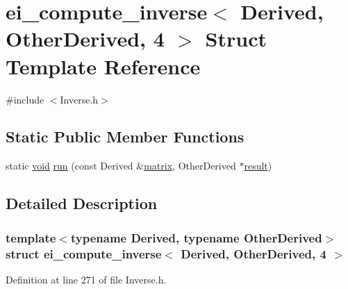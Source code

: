 \hypertarget{structei__compute__inverse_3_01_derived_00_01_other_derived_00_014_01_4}{\section{ei\-\_\-compute\-\_\-inverse$<$ Derived, Other\-Derived, 4 $>$ Struct Template Reference}
\label{structei__compute__inverse_3_01_derived_00_01_other_derived_00_014_01_4}
}


{\ttfamily \#include $<$Inverse.\-h$>$}

\subsection*{Static Public Member Functions}
\begin{DoxyCompactItemize}
\item 
static \hyperlink{group___u_a_v_objects_plugin_ga444cf2ff3f0ecbe028adce838d373f5c}{void} \hyperlink{structei__compute__inverse_3_01_derived_00_01_other_derived_00_014_01_4_a038abe47c79a8084fd44f40ad9aff57b}{run} (const Derived \&\hyperlink{glext_8h_a7b24a3f2f56eb1244ae69dacb4fecb6f}{matrix}, Other\-Derived $\ast$\hyperlink{qxtslotjob_8h_aab161efab0511ea9612b64c40e9852ca}{result})
\end{DoxyCompactItemize}


\subsection{Detailed Description}
\subsubsection*{template$<$typename Derived, typename Other\-Derived$>$struct ei\-\_\-compute\-\_\-inverse$<$ Derived, Other\-Derived, 4 $>$}



Definition at line 271 of file Inverse.\-h.



